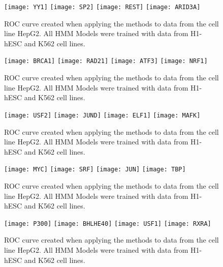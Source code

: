 \documentclass[11pt,a4]{article}
\begin{document}
\begin{figure}[h]
\centering
    \texttt{[image: YY1]}
    \texttt{[image: SP2]}
    \texttt{[image: REST]}
    \texttt{[image: ARID3A]}
\caption{ROC curve created when applying the methods to data from the cell line HepG2. All HMM Models were trained with data from H1-hESC and K562 cell lines.}
\label{fig:roc.HepG2.fdr_4.1}
\end{figure}

\begin{figure}[h]
\centering
    \texttt{[image: BRCA1]}
    \texttt{[image: RAD21]}
    \texttt{[image: ATF3]}
    \texttt{[image: NRF1]}
\caption{ROC curve created when applying the methods to data from the cell line HepG2. All HMM Models were trained with data from H1-hESC and K562 cell lines.}
\label{fig:roc.HepG2.fdr_4.2}
\end{figure}

\begin{figure}[h]
\centering
    \texttt{[image: USF2]}
    \texttt{[image: JUND]}
    \texttt{[image: ELF1]}
    \texttt{[image: MAFK]}
\caption{ROC curve created when applying the methods to data from the cell line HepG2. All HMM Models were trained with data from H1-hESC and K562 cell lines.}
\label{fig:roc.HepG2.fdr_4.3}
\end{figure}

\begin{figure}[h]
\centering
    \texttt{[image: MYC]}
    \texttt{[image: SRF]}
    \texttt{[image: JUN]}
    \texttt{[image: TBP]}
\caption{ROC curve created when applying the methods to data from the cell line HepG2. All HMM Models were trained with data from H1-hESC and K562 cell lines.}
\label{fig:roc.HepG2.fdr_4.4}
\end{figure}

\begin{figure}[h]
\centering
    \texttt{[image: P300]}
    \texttt{[image: BHLHE40]}
    \texttt{[image: USF1]}
    \texttt{[image: RXRA]}
\caption{ROC curve created when applying the methods to data from the cell line HepG2. All HMM Models were trained with data from H1-hESC and K562 cell lines.}
\label{fig:roc.HepG2.fdr_4.5}
\end{figure}
\end{document}
